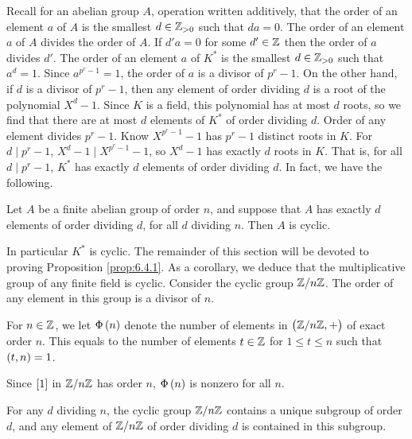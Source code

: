 Recall for an abelian group $ A $, operation written additively, that the order of an element $ a $ of $ A $ is the smallest $ d \in \mathbb{Z}_{> 0} $ such that $ da = 0 $. The order of an element $ a $ of $ A $ divides the order of $ A $. If $ d'a = 0 $ for some $ d' \in \mathbb{Z} $ then the order of $ a $ divides $ d' $. The order of an element $ a $ of $ K^* $ is the smallest $ d \in \mathbb{Z}_{> 0} $ such that $ a^d = 1 $. Since $ a^{p^r - 1} = 1 $, the order of $ a $ is a divisor of $ p^r - 1 $. On the other hand, if $ d $ is a divisor of $ p^r - 1 $, then any element of order dividing $ d $ is a root of the polynomial $ X^d - 1 $. Since $ K $ is a field, this polynomial has at most $ d $ roots, so we find that there are at most $ d $ elements of $ K^* $ of order dividing $ d $. Order of any element divides $ p^r - 1 $. Know $ X^{p^r - 1} - 1 $ has $ p^r - 1 $ distinct roots in $ K $. For $ d \mid p^r - 1 $, $ X^d - 1 \mid X^{p^r - 1} - 1 $, so $ X^d - 1 $ has exactly $ d $ roots in $ K $. That is, for all $ d \mid p^r - 1 $, $ K^* $ has exactly $ d $ elements of order dividing $ d $. In fact, we have the following.

\begin{proposition}
\label{prop:6.4.1}
Let $ A $ be a finite abelian group of order $ n $, and suppose that $ A $ has exactly $ d $ elements of order dividing $ d $, for all $ d $ dividing $ n $. Then $ A $ is cyclic.
\end{proposition}

In particular $ K^* $ is cyclic. The remainder of this section will be devoted to proving Proposition \ref{prop:6.4.1}. As a corollary, we deduce that the multiplicative group of any finite field is cyclic. Consider the cyclic group $ \mathbb{Z} / n\mathbb{Z} $. The order of any element in this group is a divisor of $ n $.

\begin{definition}
For $ n \in \mathbb{Z} $, we let $ \Phi\br{n} $ denote the number of elements in $ \br{\Z / n\Z, +} $ of exact order $ n $. This equals to the number of elements $ t \in \mathbb{Z} $ for $ 1 \le t \le n $ such that $ \br{t, n} = 1 $.
\end{definition}

\begin{note*}
Since $ \sbr{1} $ in $ \mathbb{Z} / n\mathbb{Z} $ has order $ n $, $ \Phi\br{n} $ is nonzero for all $ n $.
\end{note*}

\begin{lemma}
For any $ d $ dividing $ n $, the cyclic group $ \mathbb{Z} / n\mathbb{Z} $ contains a unique subgroup of order $ d $, and any element of $ \mathbb{Z} / n\mathbb{Z} $ of order dividing $ d $ is contained in this subgroup.
\end{lemma}

